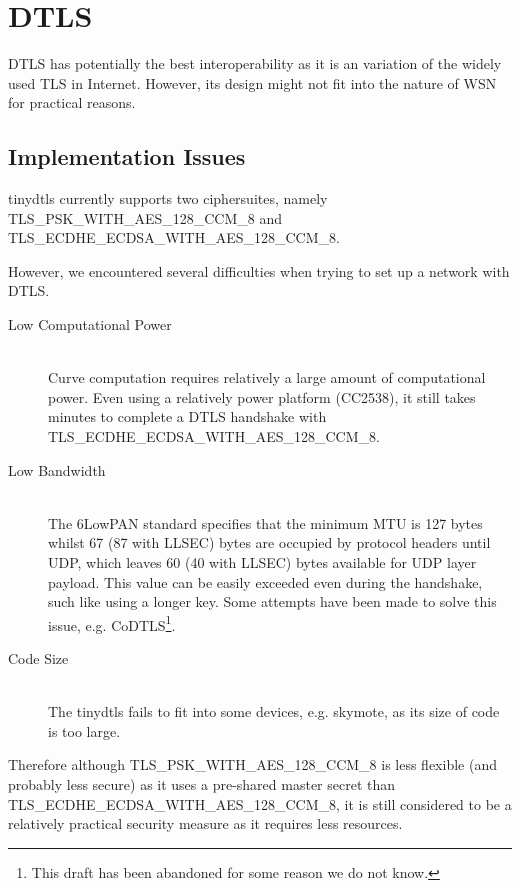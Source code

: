 \chapter{DTLS} \label{Chp: DTLS}
DTLS has potentially the best interoperability as it is an variation of the widely used TLS in Internet. However, its design might not fit into the nature of WSN for practical reasons.

\section{Implementation Issues}
tinydtls\cite{tinydtls} currently supports two ciphersuites, namely TLS\_PSK\_WITH\_AES\_128\_CCM\_8 and TLS\_ECDHE\_ECDSA\_WITH\_AES\_128\_CCM\_8. 

However, we encountered several difficulties when trying to set up a  network with DTLS.

\begin{description}
\item[Low Computational Power] \hfill \\
Curve computation requires relatively a large amount of computational power. Even using a relatively power platform (CC2538), it still takes minutes to complete a DTLS handshake with
TLS\_ECDHE\_ECDSA\_WITH\_AES\_128\_CCM\_8.

\item[Low Bandwidth] \hfill \\
The 6LowPAN standard specifies that the minimum MTU is 127 bytes whilst 67 (87 with LLSEC) bytes are occupied by protocol headers until UDP, which leaves 60 (40 with LLSEC) bytes available for UDP layer payload. This value can be easily exceeded even during the handshake, such like using a longer key. Some attempts have been made to solve this issue, e.g. CoDTLS\cite{CoDTLS}\footnote{This draft has been abandoned for some reason we do not know.}.

\item[Code Size] \hfill \\
The tinydtls fails to fit into some devices, e.g. skymote, as its size of code is too large.
\end{description}

Therefore although TLS\_PSK\_WITH\_AES\_128\_CCM\_8 is less flexible (and probably less secure) as it uses a pre-shared master secret than TLS\_ECDHE\_ECDSA\_WITH\_AES\_128\_CCM\_8, it is still considered to be a relatively practical security measure as it requires less resources.

